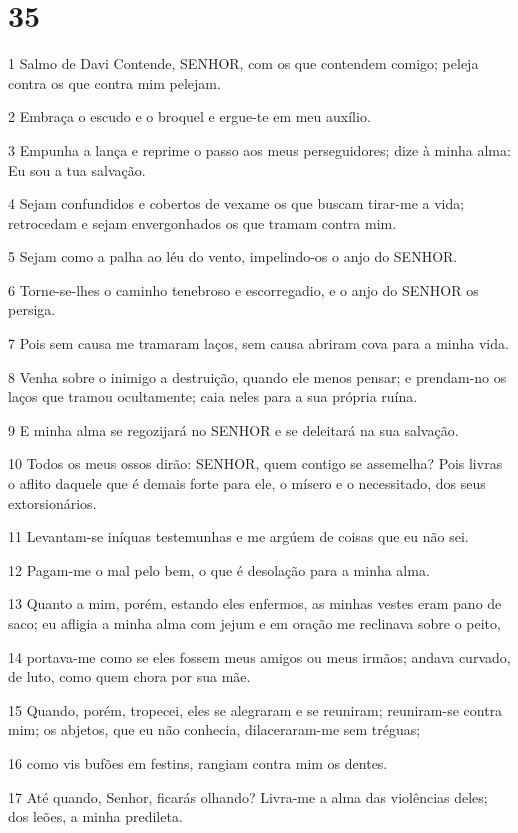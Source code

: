 \chapter{35}

\par 1 Salmo de Davi Contende, SENHOR, com os que contendem comigo; peleja contra os que contra mim pelejam.
\par 2 Embraça o escudo e o broquel e ergue-te em meu auxílio.
\par 3 Empunha a lança e reprime o passo aos meus perseguidores; dize à minha alma: Eu sou a tua salvação.
\par 4 Sejam confundidos e cobertos de vexame os que buscam tirar-me a vida; retrocedam e sejam envergonhados os que tramam contra mim.
\par 5 Sejam como a palha ao léu do vento, impelindo-os o anjo do SENHOR.
\par 6 Torne-se-lhes o caminho tenebroso e escorregadio, e o anjo do SENHOR os persiga.
\par 7 Pois sem causa me tramaram laços, sem causa abriram cova para a minha vida.
\par 8 Venha sobre o inimigo a destruição, quando ele menos pensar; e prendam-no os laços que tramou ocultamente; caia neles para a sua própria ruína.
\par 9 E minha alma se regozijará no SENHOR e se deleitará na sua salvação.
\par 10 Todos os meus ossos dirão: SENHOR, quem contigo se assemelha? Pois livras o aflito daquele que é demais forte para ele, o mísero e o necessitado, dos seus extorsionários.
\par 11 Levantam-se iníquas testemunhas e me argúem de coisas que eu não sei.
\par 12 Pagam-me o mal pelo bem, o que é desolação para a minha alma.
\par 13 Quanto a mim, porém, estando eles enfermos, as minhas vestes eram pano de saco; eu afligia a minha alma com jejum e em oração me reclinava sobre o peito,
\par 14 portava-me como se eles fossem meus amigos ou meus irmãos; andava curvado, de luto, como quem chora por sua mãe.
\par 15 Quando, porém, tropecei, eles se alegraram e se reuniram; reuniram-se contra mim; os abjetos, que eu não conhecia, dilaceraram-me sem tréguas;
\par 16 como vis bufões em festins, rangiam contra mim os dentes.
\par 17 Até quando, Senhor, ficarás olhando? Livra-me a alma das violências deles; dos leões, a minha predileta.
